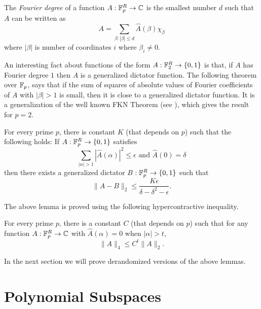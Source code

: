 \begin{definition} The \emph{Fourier degree} of a function
$A:\mathbb F_p^R \rightarrow \mathbb C$ is the smallest number $d$ such that $A$ can be
written as $$A = \sum_{\beta: |\beta| \leq d} \widehat A(\beta) \chi_\beta$$
where $|\beta|$ is number of coordinates $i$ where $\beta_i \neq 0$.
\end{definition}

An interesting fact about functions of the form $A:\mathbb F_2^R \rightarrow \{0,1\}$
is that, if $A$ has Fourier degree $1$ then $A$ is a generalized dictator function. 
The
following theorem over $\mathbb F_p$, says that if the sum of squares of absolute
values of Fourier coefficients of $A$ with $|\beta| >1$ is small, then it is
close to a generalized dictator function. It is a generalization of
the well known FKN Theorem (see \cite{FriedgutKN2002}), which
gives the result for $p=2$.

\begin{lemma} \label{thm:dict} 
For every prime $p$, there is constant
$K$ (that depends on $p$) such that the following holds: 
If $A:\mathbb F_p^R \rightarrow \{0,1\}$ satisfies
$$\sum_{|\alpha| > 1} |\widehat A(\alpha)|^2 \leq \epsilon \text{ and } \widehat
A(0) =\delta$$ 
then there exists a generalized dictator $B:\mathbb F_p^R \rightarrow \{0,1\}$ such that 
$$\|A-B\|_2 \leq \frac{K\epsilon}{\delta -\delta^2 -\epsilon}.$$
\end{lemma} 
The above lemma is proved using the following hypercontractive
inequality. 
\begin{lemma}[Hypercontractivity] \label{thm:hyp} 
For every prime $p$, there is a
constant $C$ (that depends on $p$)
 such that for any function $A:\mathbb F_p^R \rightarrow \mathbb C$ with $\widehat
A(\alpha) = 0$ when $|\alpha| > t$, 
$$ \|A\|_4 \leq C^t \|A\|_2.$$ 
\end{lemma}

In the next section we will prove derandomized versions of the above lemmas.

\section{Polynomial Subspaces} 

